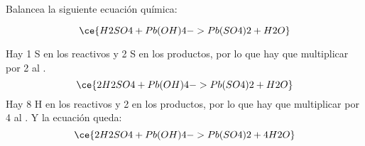 Balancea la siguiente ecuación química:

\[
    \ce{H2SO4 + Pb(OH)4 -> Pb(SO4)2 + H2O}
\]

\begin{solutionbox}{4.5cm}
    Hay 1 S en los reactivos y 2 S en los productos, por lo que hay que multiplicar por 2 al .
    \[
        \ce{2H2SO4 + Pb(OH)4 -> Pb(SO4)2 + H2O}
    \]
    Hay 8 H en los reactivos y 2 en los productos, por lo que hay que multiplicar por 4 al . Y la ecuación queda:
    \[
        \ce{2H2SO4 + Pb(OH)4 -> Pb(SO4)2 + 4H2O}
    \]
\end{solutionbox}